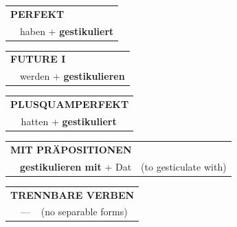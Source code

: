 \documentclass[10pt,a4paper]{revtex4-2}
\begin{document}
\begin{verbbox}
\vspace{10pt}

\begin{tabular}{rl}
\multicolumn{2}{l}{\textbf{PERFEKT}}\\
& haben + \textbf{gestikuliert}\\
\end{tabular}
\hfill
\begin{tabular}{rl}
\multicolumn{2}{l}{\textbf{FUTURE I}}\\
& werden + \textbf{gestikulieren}\\
\end{tabular}
\hfill
\begin{tabular}{rl}
\multicolumn{2}{l}{\textbf{PLUSQUAMPERFEKT}}\\
& hatten + \textbf{gestikuliert}\\
\end{tabular}

\vspace{10pt}

\begin{tabular}{lll}
\multicolumn{3}{l}{\textbf{MIT PRÄPOSITIONEN}}\\
& \textbf{gestikulieren mit} + Dat & (to gesticulate with)\\
\end{tabular}
\hfill
\begin{tabular}{lll}
\multicolumn{3}{l}{\textbf{TRENNBARE VERBEN}}\\
& --- & (no separable forms)\\
\end{tabular}
\vspace{-5pt}
\end{verbbox}
\end{document}
